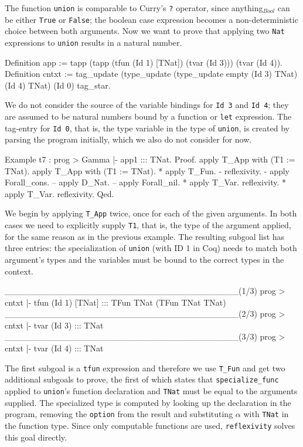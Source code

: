 \documentclass[paper = a4, fleqn, abstract=on, twoside]{scrreprt}
\newcommand{\coqinline}[1]{\texttt{#1}}
\begin{document}
The function \texttt{union} is comparable to Curry's \texttt{?} operator, since anything$_{Bool}$ can be either \texttt{True} or \texttt{False}; the boolean case expression becomes a non-deterministic choice between both arguments. Now we want to prove that applying two \texttt{Nat} expressions to \texttt{union} results in a natural number. 
\begin{coqcode}
Definition app := tapp
                     (tapp (tfun (Id 1) [TNat])
                           (tvar (Id 3)))
                     (tvar (Id 4)).
Definition cntxt := tag_update
                      (type_update
                        (type_update empty (Id 3) TNat)
                      (Id 4) TNat)
                    (Id 0) tag_star.
\end{coqcode}
We do not consider the source of the variable bindings for \texttt{Id 3} and \texttt{Id 4}; they are assumed to be natural numbers bound by a function or \texttt{let} expression. The tag-entry for \texttt{Id 0}, that is, the type variable in the type of \texttt{union}, is created by parsing the program initially, which we also do not consider for now.
\newpage
\begin{coqcode}    
Example t7 : prog > Gamma |- app1 ::: TNat.              
Proof.
 apply T_App with (T1 := TNat). apply T_App with (T1 := TNat).
   * apply T_Fun.
     - reflexivity.
     - apply Forall_cons.
       -- apply D_Nat.
       -- apply Forall_nil.
   * apply T_Var. reflexivity.
   * apply T_Var. reflexivity.
Qed.
\end{coqcode}
We begin by applying \coqinline{T_App} twice, once for each of the given arguments. In both cases we need to explicitly supply \coqinline{T1}, that is, the type of the argument applied, for the same reason as in the previous example. The resulting subgoal list has three entries: the specialization of \texttt{union} (with ID 1 in Coq) needs to match both argument's types and the variables must be bound to the correct types in the context. 
\begin{coqcode}
______________________________________(1/3)
prog > cntxt |- tfun (Id 1) [TNat] ::: TFun TNat (TFun TNat TNat)
______________________________________(2/3)
prog > cntxt |- tvar (Id 3) ::: TNat
______________________________________(3/3)
prog > cntxt |- tvar (Id 4) ::: TNat
\end{coqcode}
The first subgoal is a \coqinline{tfun} expression and therefore we use \coqinline{T_Fun} and get two additional subgoals to prove, the first of which states that \coqinline{specialize_func} applied to \texttt{union}'s function declaration and \texttt{TNat} must be equal to the arguments supplied. The specialized type is computed by looking up the declaration in the program, removing the \coqinline{option} from the result and substituting $\alpha$ with \coqinline{TNat} in the function type. Since only computable functions are used, \coqinline{reflexivity} solves this goal directly.
\end{document}
